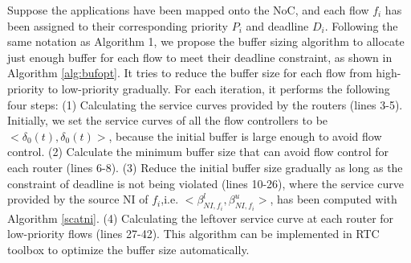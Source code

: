 \documentclass[preprint]{elsarticle}
\begin{document}
Suppose the applications have been mapped onto the NoC, and each flow $f_i$ has been assigned to their corresponding priority $P_i$ and deadline $D_i$. Following the same notation as Algorithm 1, we propose the buffer sizing algorithm to allocate just enough buffer for each flow to meet their deadline constraint, as shown in Algorithm \ref{alg:bufopt}. It tries to reduce the buffer size for each flow from high-priority to low-priority gradually. For each iteration, it performs the following four steps: (1) Calculating the service curves provided by the routers (lines 3-5). Initially, we set the service curves of all the flow controllers to be $<\delta_0(t),\delta_0(t)>$, because the initial buffer is large enough to avoid flow control. (2) Calculate the minimum buffer size that can avoid flow control for each router (lines 6-8). (3) Reduce the initial buffer size gradually as long as the constraint of deadline is not being violated (lines 10-26), where the service curve provided by the source NI of $f_i$,i.e. $<\beta_{NI,f_i}^l,\beta_{NI,f_i}^u>$, has been computed with Algorithm \ref{scatni}. (4) Calculating the leftover service curve at each router for low-priority flows (lines 27-42). This algorithm can be implemented in RTC toolbox \cite{rtc} to optimize the buffer size automatically.
\end{document}
